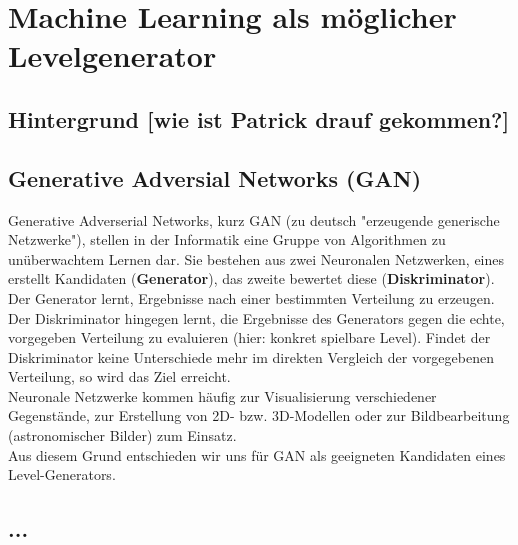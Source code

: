 \section{Machine Learning als möglicher Levelgenerator}
\subsection{Hintergrund [wie ist Patrick drauf gekommen?]}
\subsection{Generative Adversial Networks (GAN)}
Generative Adverserial Networks, kurz GAN (zu deutsch "erzeugende generische Netzwerke"), stellen in der Informatik eine Gruppe von Algorithmen zu unüberwachtem Lernen dar. Sie bestehen aus zwei Neuronalen Netzwerken, eines erstellt Kandidaten (\textbf{Generator}), das zweite bewertet diese (\textbf{Diskriminator}).\\Der Generator lernt, Ergebnisse nach einer bestimmten Verteilung zu erzeugen. Der Diskriminator hingegen lernt, die Ergebnisse des Generators gegen die echte, vorgegeben Verteilung zu evaluieren (hier: konkret spielbare Level). Findet der Diskriminator keine Unterschiede mehr im direkten Vergleich der vorgegebenen Verteilung, so wird das Ziel erreicht.\\Neuronale Netzwerke kommen häufig zur Visualisierung verschiedener Gegenstände, zur Erstellung von 2D- bzw. 3D-Modellen oder zur Bildbearbeitung (astronomischer Bilder) zum Einsatz.\\Aus diesem Grund entschieden wir uns für GAN als geeigneten Kandidaten eines Level-Generators.
\subsection{...}